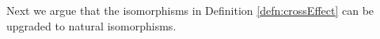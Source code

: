 



Next we argue that the isomorphisms in Definition \ref{defn:crossEffect} can be upgraded to natural isomorphisms.

